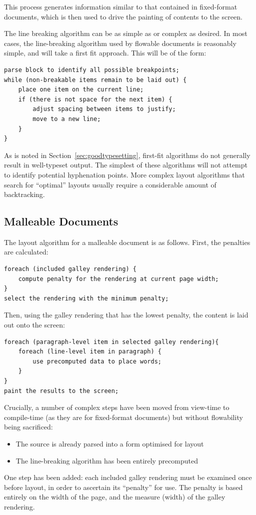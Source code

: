 This process generates information similar to that contained in fixed-format documents, which is then used to drive the painting of contents to the screen.

The line breaking algorithm can be as simple as or complex as desired. In most cases, the line-breaking algorithm used by flowable documents is reasonably simple, and will take a first fit approach. This will be of the form:

{\singlespacing
\begin{lstlisting}
parse block to identify all possible breakpoints;
while (non-breakable items remain to be laid out) {
    place one item on the current line;
    if (there is not space for the next item) {
        adjust spacing between items to justify;
        move to a new line;
    }
}
\end{lstlisting}
}

As is noted in Section~\ref{sec:goodtypesetting}, first-fit algorithms do not generally result in well-typeset output. The simplest of these algorithms will not attempt to identify potential hyphenation points. More complex layout algorithms that search for ``optimal'' layouts usually require a considerable amount of backtracking.

\newpage
\subsection{Malleable Documents}

The layout algorithm for a malleable document is as follows. First, the penalties are calculated:

{\singlespacing
\begin{lstlisting}
foreach (included galley rendering) {
    compute penalty for the rendering at current page width;
}
select the rendering with the minimum penalty;
\end{lstlisting}
}


Then, using the galley rendering that has the lowest penalty, the content is laid out onto the screen:

{\singlespacing
\begin{lstlisting}
foreach (paragraph-level item in selected galley rendering){
    foreach (line-level item in paragraph) {
        use precomputed data to place words;
    }
}
paint the results to the screen;
\end{lstlisting}
}
Crucially, a number of complex steps have been moved from view-time to compile-time (as they are for fixed-format documents) but without flowability being sacrificed:
\begin{itemize}
 \item The source is already parsed into a form optimised for layout
 \item The line-breaking algorithm has been entirely precomputed
\end{itemize}
One step has been added: each included galley rendering must be examined once before layout, in order to ascertain its ``penalty'' for use. The penalty is based entirely on the width of the page, and the \gls{measure} (width) of the galley rendering.%

